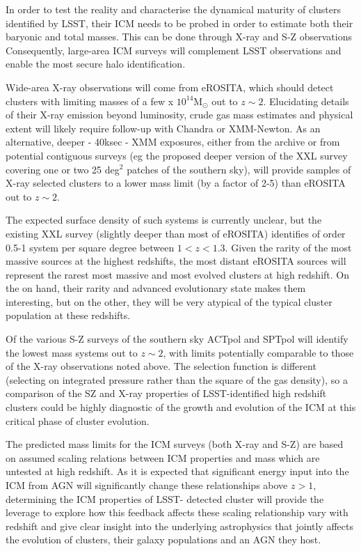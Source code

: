\documentclass[a4paper,11pt]{article}
\begin{document}
In order to test the reality and characterise the dynamical maturity
of clusters identified by LSST, their ICM needs to be probed in order
to estimate both their baryonic and total masses. This can be done
through X-ray and S-Z observations Consequently, large-area ICM
surveys will complement LSST observations and enable the most secure
halo identification.

Wide-area X-ray observations will come from eROSITA, which should
detect clusters with limiting masses of a few x $10^{14}$M$_\odot$ out
to $z\sim2$. Elucidating details of their X-ray emission beyond
luminosity, crude gas mass estimates and physical extent will likely
require follow-up with Chandra or XMM-Newton. As an alternative,
deeper - 40ksec - XMM exposures, either from the archive or from
potential contiguous surveys (eg the proposed deeper version of the
XXL survey covering one or two 25 deg$^2$ patches of the southern
sky), will provide samples of X-ray selected clusters to a lower mass
limit (by a factor of 2-5) than eROSITA out to $z\sim 2$.

The expected surface density of such systems is currently unclear, but
the existing XXL survey (slightly deeper than most of eROSITA)
identifies of order 0.5-1 system per square degree between $1<z<1.3$.
Given the rarity of the most massive sources at the highest redshifts,
the most distant eROSITA sources will represent the rarest most
massive and most evolved clusters at high redshift.  On the on hand,
their rarity and advanced evolutionary state makes them interesting,
but on the other, they will be very atypical of the typical cluster
population at these redshifts.

Of the various S-Z surveys of the southern sky ACTpol and SPTpol will
identify the lowest mass systems out to $z\sim 2$, with limits
potentially comparable to those of the X-ray observations noted
above. The selection function is different (selecting on integrated
pressure rather than the square of the gas density), so a comparison
of the SZ and X-ray properties of LSST-identified high redshift
clusters could be highly diagnostic of the growth and evolution of the
ICM at this critical phase of cluster evolution.

The predicted mass limits for the ICM surveys (both X-ray and S-Z) are
based on assumed scaling relations between ICM properties and mass
which are untested at high redshift. As it is expected that
significant energy input into the ICM from AGN will significantly
change these relationships above $z>1$, determining the ICM properties
of LSST- detected cluster will provide the leverage to explore how
this feedback affects these scaling relationship vary with redshift
and give clear insight into the underlying astrophysics that jointly
affects the evolution of clusters, their galaxy populations and an AGN
they host.
\end{document}
